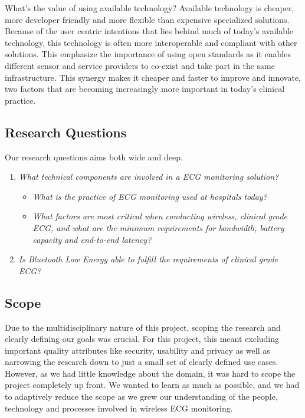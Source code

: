 What's the value of using available technology? Available technology is cheaper, more developer friendly and more flexible than expensive specialized solutions. Because of the user centric intentions that lies behind much of today's available technology, this technology is often more interoperable and compliant with other solutions. This emphasize the importance of using open standards as it enables different sensor and service providers to co-exist and take part in the same infrastructure. This synergy makes it cheaper and faster to improve and innovate, two factors that are becoming increasingly more important in today's clinical practice.

\subsection{Research Questions} 


Our research questions aims both wide and deep.

\label{ssub:research_questions} 
\begin{enumerate}
	
	\item \textit{What technical components are involved in a ECG monitoring solution?} 
	\begin{itemize}
		
		\item \textit{What is the practice of ECG monitoring used at hospitals today?}
		
		\item \textit{What factors are most critical when conducting wireless, clinical grade ECG, and what are the minimum requirements for bandwidth, battery capacity and end-to-end latency?}
	\end{itemize}
	
	\item \textit{Is Bluetooth Low Energy able to fulfill the requirements of clinical grade ECG?}
\end{enumerate}

\subsection{Scope} 

\label{sub:scope}

Due to the multidisciplinary nature of this project, scoping the research and clearly defining our goals was crucial. For this project, this meant excluding important quality attributes like security, usability and privacy as well as narrowing the research down to just a small set of clearly defined use cases. However, as we had little knowledge about the domain, it was hard to scope the project completely up front. We wanted to learn as much as possible, and we had to adaptively reduce the scope as we grew our understanding of the people, technology and processes involved in wireless ECG monitoring. 

